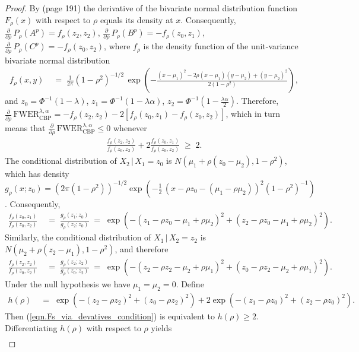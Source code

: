 \documentclass {imsart}
\newcommand{\FWERcb}{\mathrm{FWER}_{\mathrm{CBP}}^{\lambda,\alpha}}
\begin{document}
\begin{proof}
By \citet{Tong90} (page 191) the derivative of the bivariate normal distribution function $F_\rho(x)$ with respect to $\rho$ equals its density at $x$. Consequently, $\tfrac{\partial}{\partial\rho}\,P_{\!\!\rho}(A^p)=f_\rho(z_2,z_2)$, $\tfrac{\partial}{\partial\rho}\,P_{\!\!\rho}(B^p)=-f_\rho(z_0,z_1)$, $\tfrac{\partial}{\partial\rho}\,P_{\!\!\rho}(C^p)=-f_\rho(z_0,z_2)$, where $f_\rho$ is the density function of the unit-variance bivariate normal distribution
\begin{align*}
f_\rho(x,y)&\;=\;\tfrac{1}{2\pi}(1-\rho^2)^{-1/2}\,\exp(-\tfrac{(x-\mu_1)^2-2\rho{}(x-\mu_1)(y-\mu_2)+(y-\mu_2)^2}{2(1-\rho^2)}),
\end{align*}
and $z_0=\Phi^{-1}(1-\lambda)$, $z_1=\Phi^{-1}(1-\lambda\alpha)$, $z_2=\Phi^{-1}(1-\tfrac{\lambda\alpha}{2})$. Therefore, $\tfrac{\partial}{\partial\rho}\,\FWERcb=-f_\rho(z_2,z_2)-2[f_\rho(z_0,z_1)-f_\rho(z_0,z_2)]$, which in turn means that $\tfrac{\partial}{\partial\rho}\,\FWERcb\leq0$ whenever
\begin{align}
\label{eqn.Fs_via_devatives_condition}
\frac{f_\rho(z_2,z_2)}{f_\rho(z_0,z_2)}+2\frac{f_\rho(z_0,z_1)}{f_\rho(z_0,z_2)}\;\geq\;2.
\end{align}
The conditional distribution of $X_2\,|\,X_1=z_0$ is $N(\mu_1+\rho(z_0-\mu_2), 1-\rho^2)$, which has density
$g_\rho(x;z_0)=(2\pi(1-\rho^2))^{-1/2}\exp(-\tfrac{1}{2}\,(x-\rho{}z_0-(\mu_1-\rho\mu_2))^2(1-\rho^2)^{-1})$. Consequently,
\begin{align*}
\frac{f_\rho(z_0,z_1)}{f_\rho(z_0,z_2)}&\;=\;\frac{g_\rho(z_1;z_0)}{g_\rho(z_2;z_0)}\;=\;\exp(-(z_1-\rho{}z_0-\mu_1+\rho\mu_2)^2+(z_2-\rho{}z_0-\mu_1+\rho\mu_2)^2).
\end{align*}
Similarly, the conditional distribution of $X_1\,|\,X_2=z_2$ is $N(\mu_2+\rho(z_2-\mu_1), 1-\rho^2)$, and therefore
\begin{align*}
\frac{f_\rho(z_2,z_2)}{f_\rho(z_0,z_2)}&\;=\;\frac{g_\rho(z_2;z_2)}{g_\rho(z_0;z_2)}\;=\;\exp(-(z_2-\rho{}z_2-\mu_2+\rho\mu_1)^2+(z_0-\rho{}z_2-\mu_2+\rho\mu_1)^2).
\end{align*}
Under the null hypothesis we have $\mu_1=\mu_2=0$. Define
\begin{align}
\label{eqn.h_rho}
h(\rho)&\;=\;\exp(-(z_2-\rho{}z_2)^2+(z_0-\rho{}z_2)^2)+2\exp(-(z_1-\rho{}z_0)^2+(z_2-\rho{}z_0)^2).
\end{align}
Then (\ref{eqn.Fs_via_devatives_condition}) is equivalent to $h(\rho)\geq2$. Differentiating $h(\rho)$ with respect to $\rho$ yields
\begin{align*}

\end{align*}
\end{proof}
\end{document}
